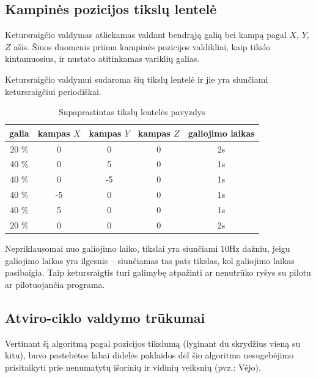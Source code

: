 \documentclass[12pt, a4paper, lithuanian, final]{article}
\begin{document}
\subsection{Kampinės pozicijos tikslų lentelė}

Ketursraigčio valdymas atliekamas valdant bendrąją galią bei kampą pagal $X$, $Y$, $Z$ ašis.
Šiuos duomenis priima kampinės pozicijos valdikliai, kaip tikslo kintamuosius, ir nustato atitinkamas variklių galias.

Ketursraigčio valdymui sudaroma šių tikslų lentelė ir jie yra siunčiami ketursraigčiui periodiškai.

\begin{center}
\begin{table}[h]
\begin{tabular}{ | c | c | c | c | c | }
	\hline
	\textbf{galia} & \textbf{kampas $X$} & \textbf{kampas $Y$} & \textbf{kampas $Z$} & \textbf{galiojimo laikas} \\
	\hline
	20 \% & 0\degree & 0\degree & 0\degree & 2s \\
	\hline
	40 \% & 0\degree & 5\degree & 0\degree & 1s \\
	\hline
	40 \% & 0\degree & -5\degree & 0\degree & 1s \\
	\hline
	40 \% & -5\degree & 0\degree & 0\degree & 1s \\
	\hline
	40 \% & 5\degree & 0\degree & 0\degree & 1s \\
	\hline
	20 \% & 0\degree & 0\degree & 0\degree & 2s \\
	\hline
\end{tabular}
\caption{Supaprastintas tikslų lentelės pavyzdys}
\end{table}
\end{center}

Nepriklausomai nuo galiojimo laiko, tikslai yra siunčiami 10Hz dažniu, jeigu galiojimo laikas yra ilgesnis -- siunčiamas tas pats tikslas, kol galiojimo laikas pasibaigia.
Taip ketursraigtis turi galimybę atpažinti ar nenutrūko ryšys su pilotu ar pilotuojančia programa.

\subsection{Atviro-ciklo valdymo trūkumai}

Vertinant šį algoritmą pagal pozicijos tikslumą (lyginant du skrydžius vieną su kitu), buvo pastebėtos labai didelės paklaidos dėl šio algoritmo nesugebėjimo prisitaikyti prie nenumatytų išorinių ir vidinių veiksnių (pvz.: Vėjo).
\end{document}
